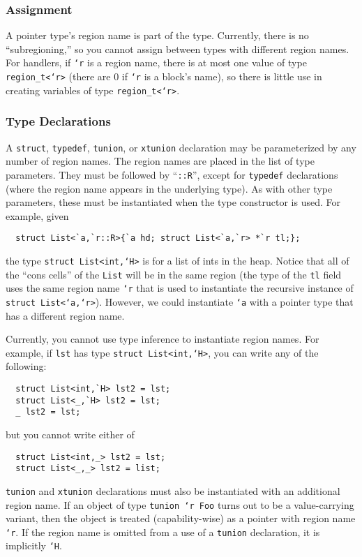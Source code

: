 \subsubsection{Assignment}

A pointer type's region name is part of the type.  Currently, there is
no ``subregioning,'' so you cannot assign between types with different
region names.  For handlers, if \texttt{`r} is a region name, there is
at most one value of type \texttt{region_t<`r>} (there are 0 if
\texttt{`r} is a block's name), so there is little use in creating
variables of type \texttt{region_t<`r>}.

\subsubsection{Type Declarations}

A \texttt{struct}, \texttt{typedef}, \texttt{tunion}, or \texttt{xtunion}
declaration may be parameterized by any number of region names.  The
region names are placed in the list of type parameters.  They must be
followed by ``\texttt{::R}'', except for \texttt{typedef} declarations
(where the region name appears in the underlying type).  As with other
type parameters, these must be instantiated when the type constructor
is used.  For example, given
\begin{verbatim}
  struct List<`a,`r::R>{`a hd; struct List<`a,`r> *`r tl;};
\end{verbatim}
the type \texttt{struct List<int,`H>} is for a list of ints in the heap.
Notice that all of the ``cons cells'' of the \texttt{List} will be in
the same region (the type of the \texttt{tl} field uses the same
region name \texttt{`r} that is used to instantiate the recursive
instance of \texttt{struct List<`a,`r>}).  However, we could instantiate
\texttt{`a} with a pointer type that has a different region name.

Currently, you cannot use type inference to instantiate region names.
For example, if \texttt{lst} has type \texttt{struct List<int,`H>}, you
can write any of the following:
\begin{verbatim}
  struct List<int,`H> lst2 = lst;
  struct List<_,`H> lst2 = lst;
  _ lst2 = lst;
\end{verbatim}
but you cannot write either of
\begin{verbatim}
  struct List<int,_> lst2 = lst;
  struct List<_,_> lst2 = list;
\end{verbatim}

\texttt{tunion} and \texttt{xtunion} declarations must also be
instantiated with an additional region name.  If an object of type
\texttt{tunion `r Foo} turns out to be a value-carrying variant, then
the object is treated (capability-wise) as a pointer with region name
\texttt{`r}.  If the region name is omitted from a use of a
\texttt{tunion} declaration, it is implicitly \texttt{`H}.

